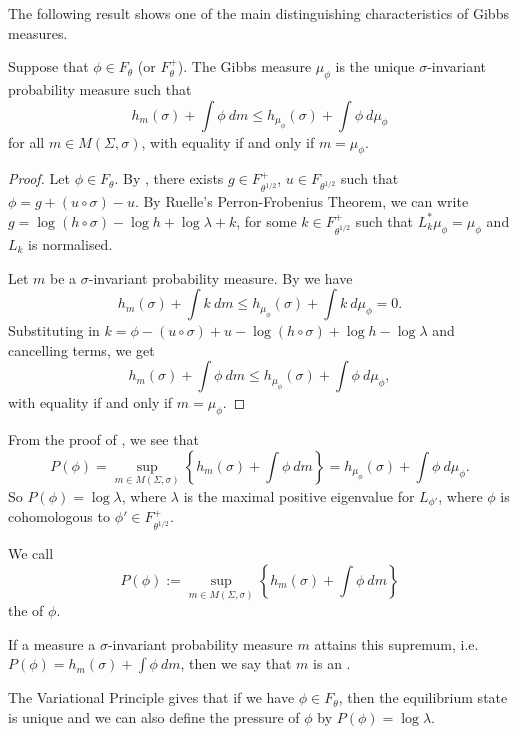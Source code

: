 The following result shows one of the main distinguishing characteristics of Gibbs measures.

\begin{theorem} \label{thm:variational-principle}
	Suppose that $\phi \in F_\theta$ (or $F_\theta^+$). The Gibbs measure $\mu_\phi$ is the unique $\sigma$-invariant probability measure such that
	\[
		h_m(\sigma) + \int{\phi\ dm} \leq h_{\mu_\phi}(\sigma) + \int{\phi\ d\mu_\phi}
	\]
	for all $m \in M(\Sigma, \sigma)$, with equality if and only if $m = \mu_\phi$.
	\begin{proof}
		Let $\phi \in F_\theta$. By , there exists $g \in F_{\theta^{1 / 2}}^+$, $u \in F_{\theta^{1 / 2}}$ such that $\phi = g + (u \circ \sigma) - u$. By Ruelle's Perron-Frobenius Theorem, we can write $g = \log(h \circ \sigma) - \log{h} + \log{\lambda} + k$, for some $k \in F_{\theta^{1/2}}^+$ such that $L_k^*{\mu_\phi} = \mu_\phi$ and $L_k$ is normalised.
		
		Let $m$ be a $\sigma$-invariant probability measure. By  we have
		\[
			h_m(\sigma) + \int{k\ dm} \leq h_{\mu_\phi}(\sigma) + \int{k\ d\mu_\phi} = 0.
		\]
		Substituting in $k = \phi - (u \circ \sigma) + u - \log(h \circ \sigma) + \log{h} - \log{\lambda}$ and cancelling terms, we get
		\[
			h_m(\sigma) + \int{\phi\ dm} \leq h_{\mu_\phi}(\sigma) + \int{\phi\ d\mu_\phi},
		\]
		with equality if and only if $m = \mu_\phi$.
	\end{proof}
\end{theorem}

From the proof of , we see that
\[
	P(\phi) = \sup_{m \in M(\Sigma, \sigma)}\left\{h_m(\sigma) + \int{\phi\ dm}\right\} = h_{\mu_\phi}(\sigma) + \int{\phi\ d\mu_\phi}.
\]
So $P(\phi) = \log{\lambda}$, where $\lambda$ is the maximal positive eigenvalue for $L_{\phi'}$, where $\phi$ is cohomologous to $\phi' \in F_{\theta^{1 / 2}}^+$.

\begin{definition}
	We call
	\[
		P(\phi) := \sup_{m \in M(\Sigma, \sigma)}\left\{h_m(\sigma) + \int{\phi\ dm}\right\}
	\]
	the  of $\phi$.
	
	If a measure a $\sigma$-invariant probability measure $m$ attains this supremum, i.e. $P(\phi) = h_m(\sigma) + \int{\phi\ dm}$, then we say that $m$ is an .
\end{definition}

The Variational Principle gives that if we have $\phi \in F_\theta$, then the equilibrium state is unique and we can also define the pressure of $\phi$ by $P(\phi) = \log{\lambda}$.

